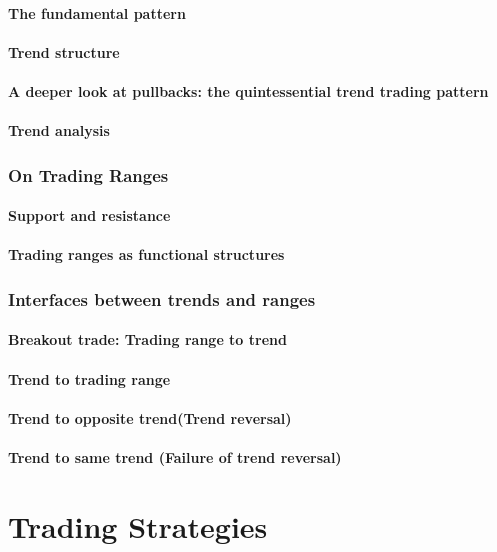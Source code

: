 \documentclass[10pt,twocolumn]{article}
\begin{document}
\subsection{The fundamental pattern}
\subsection{Trend structure}
\subsection{A deeper look at pullbacks: the quintessential trend trading pattern}
\subsection{Trend analysis}

\section{On Trading Ranges}
\subsection{Support and resistance}
\subsection{Trading ranges as functional structures}
\section{Interfaces between trends and ranges}
\subsection{Breakout trade: Trading range to trend}
\subsection{Trend to trading range}
\subsection{Trend to opposite trend(Trend reversal)}
\subsection{Trend to same trend (Failure of trend reversal)}

\part{Trading Strategies}
\end{document}

